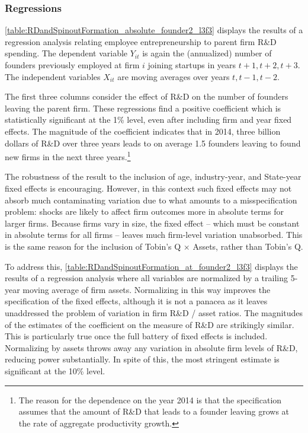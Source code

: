 \documentclass[12pt,english]{article}
\theoremstyle{remark}
\begin{document}
\subsubsection{Regressions}

\autoref{table:RDandSpinoutFormation_absolute_founder2_l3f3} displays the results of a regression analysis relating employee entrepreneurship to parent firm R\&D spending. The dependent variable $Y_{it}$ is again the (annualized) number of founders previously employed at firm $i$ joining startups in years $t+1,t+2,t+3$. The independent variables $X_{it}$ are moving averages over years $t,t-1,t-2$. 

The first three columns consider the effect of R\&D on the number of founders leaving the parent firm. These regressions find a positive coefficient which is statistically significant at the 1\% level, even after including firm and year fixed effects. The magnitude of the coefficient indicates that in 2014, three billion dollars of R\&D over three years leads to on average 1.5 founders leaving to found new firms in the next three years.\footnote{The reason for the dependence on the year 2014 is that the specification assumes that the amount of R\&D that leads to a founder leaving grows at the rate of aggregate productivity growth.}


The robustness of the result to the inclusion of age, industry-year, and State-year fixed effects is encouraging. However, in this context such fixed effects may not absorb much contaminating variation due to what amounts to a misspecification problem: shocks are likely to affect firm outcomes more in absolute terms for larger firms. Because firms vary in size, the fixed effect -- which must be constant in absolute terms for all firms -- leaves much firm-level variation unabsorbed. This is the same reason for the inclusion of Tobin's Q $\times$ Assets, rather than Tobin's Q. 

To address this, \autoref{table:RDandSpinoutFormation_at_founder2_l3f3} displays the results of a regression analysis where all variables are normalized by a trailing 5-year moving average of firm assets. Normalizing in this way improves the specification of the fixed effects, although it is not a panacea as it leaves unaddressed the problem of variation in firm R\&D / asset ratios. The magnitudes of the estimates of the coefficient on the measure of R\&D are strikingly similar. This is particularly true once the full battery of fixed effects is included. Normalizing by assets throws away any variation in absolute firm levels of R\&D, reducing power substantially. In spite of this, the most stringent estimate is significant at the 10\% level.
\end{document}

